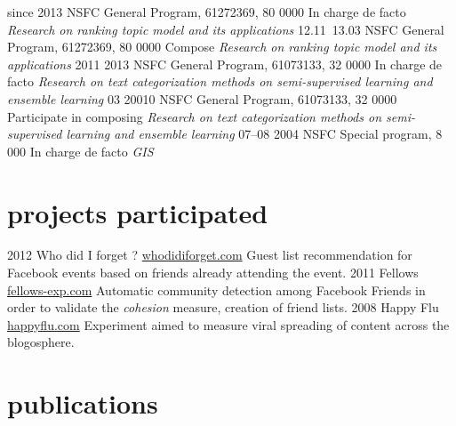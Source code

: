 \documentclass[]{friggeri-cv}
\begin{document}
\begin{entrylist}
  \entry
    {since 2013}
    {NSFC General Program, 61272369, 80 0000}
    {In charge de facto}
    {\emph{Research on ranking topic model and its applications}}
  \entry
    {12.11~13.03}
    {NSFC General Program, 61272369, 80 0000}
    {Compose}
    {\emph{Research on ranking topic model and its applications}}
  \entry
    {2011 2013}
    {NSFC General Program, 61073133, 32 0000}
    {In charge de facto}
    {\emph{Research on text categorization methods on semi-supervised learning
    and ensemble learning}}
  \entry
    {03 20010}
    {NSFC General Program, 61073133, 32 0000}
    {Participate in composing}
    {\emph{Research on text categorization methods on semi-supervised learning
    and ensemble learning}}
  \entry
    {07–08 2004}
    {NSFC Special program, 8 000}
    {In charge de facto}
    {\emph{GIS}}
\end{entrylist}

\section{projects participated}

\begin{entrylist}
  \entry
    {2012}
    {Who did I forget ?}
    {\href{http://whodidiforget.com}{whodidiforget.com}}
    {Guest list recommendation for Facebook events based on friends already attending the event.}
  \entry
    {2011}
    {Fellows}
    {\href{http://fellows-exp.com}{fellows-exp.com}}
    {Automatic community detection among Facebook Friends in order to validate the \emph{cohesion} measure, creation of friend lists.}
  \entry
    {2008}
    {Happy Flu}
    {\href{http://happyflu.com}{happyflu.com}}
    {Experiment aimed to measure viral spreading of content across the blogosphere.}
\end{entrylist}

\section{publications}


\begin{refsection}
  \nocite{*}
  \printbibliography[sorting=chronological, type=inproceedings, title={international peer-reviewed conferences/proceedings}, notkeyword={france}, heading=subbibliography]
\end{refsection}
\begin{refsection}
  \nocite{*}
  \printbibliography[sorting=chronological, type=inproceedings, title={local peer-reviewed conferences/proceedings}, keyword={france}, heading=subbibliography]
\end{refsection}
\end{document}
